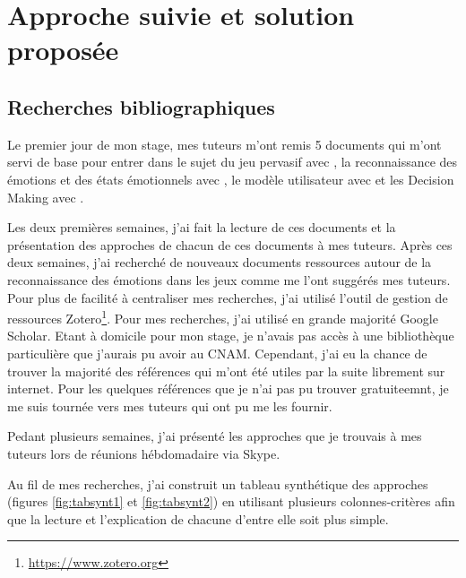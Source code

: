 \documentclass{article}
\begin{document}
\section{Approche suivie et solution proposée}
	\subsection{Recherches bibliographiques}
		Le premier jour de mon stage, mes tuteurs m'ont remis 5 documents qui m'ont servi de base pour entrer dans le sujet du jeu pervasif avec \cite{gal_2019}, la reconnaissance des émotions et des états émotionnels avec \cite{gal_2019,gizycka_et_al._2018,nalepa_et_al._2019}, le modèle utilisateur avec \cite{alhudar_2019} et les Decision Making avec \cite{kornyshova_et_al._2010}.\par
		Les deux premières semaines, j'ai fait la lecture de ces documents et la présentation des approches de chacun de ces documents à mes tuteurs.
		Après ces deux semaines, j'ai recherché de nouveaux documents ressources autour de la reconnaissance des émotions dans les jeux comme me l'ont suggérés mes tuteurs. 
		Pour plus de facilité à centraliser mes recherches, j'ai utilisé l'outil de gestion de ressources Zotero\footnote{\href{https://www.zotero.org}{https://www.zotero.org}}. 
		Pour mes recherches, j'ai utilisé en grande majorité Google Scholar. 
		Etant à domicile pour mon stage, je n'avais pas accès à une bibliothèque particulière que j'aurais pu avoir au CNAM. 
		Cependant, j'ai eu la chance de trouver la majorité des références qui m'ont été utiles par la suite librement sur internet. 
		Pour les quelques références que je n'ai pas pu trouver gratuiteemnt, je me suis tournée vers mes tuteurs qui ont pu me les fournir.\par
		Pedant plusieurs semaines, j'ai présenté les approches que je trouvais à mes tuteurs lors de réunions hébdomadaire via Skype.\par
		Au fil de mes recherches, j'ai construit un tableau synthétique des approches (figures \ref{fig:tabsynt1} et \ref{fig:tabsynt2}) en utilisant plusieurs colonnes-critères afin que la lecture et l'explication de chacune d'entre elle soit plus simple.\par
\end{document}
